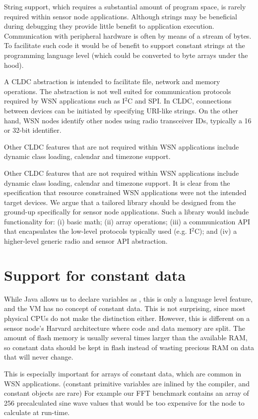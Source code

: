 String support, which requires a substantial amount of program space, is rarely required within sensor node applications. Although strings may be beneficial during debugging they provide little benefit to application execution. Communication with peripheral hardware is often by means of a stream of bytes. To facilitate such code it would be of benefit to support constant strings at the programming language level (which could be converted to byte arrays under the hood).

A CLDC  abstraction is intended to facilitate file, network and memory operations. The abstraction is not well suited for communication protocols required by WSN applications such as I$^{2}$C and SPI. In CLDC, connections between devices can be initiated by specifying URI-like strings. On the other hand, WSN nodes identify other nodes using radio transceiver IDs, typically a 16 or 32-bit identifier.

Other CLDC features that are not required within WSN applications include dynamic class loading, calendar and timezone support.

Other CLDC features that are not required within WSN applications include dynamic class loading, calendar and timezone support. It is clear from the specification that resource constrained WSN applications were not the intended target devices. We argue that a tailored library should be designed from the ground-up specifically for sensor node applications. Such a library would include functionality for: (i) basic math; (ii) array operations; (iii) a communication API that encapsulates the low-level protocols typically used (e.g. I$^{2}$C); and (iv) a higher-level generic radio and sensor API abstraction.

\section{Support for constant data}
\label{sec-const-data}
While Java allows us to declare variables as , this is only a language level feature, and the VM has no concept of constant data. This is not surprising, since most physical CPUs do not make the distinction either. However, this is different on a sensor node's Harvard architecture where code and data memory are split. The amount of flash memory is usually several times larger than the available RAM, so constant data should be kept in flash instead of wasting precious RAM on data that will never change.

This is especially important for arrays of constant data, which are common in WSN applications. (constant primitive variables are inlined by the compiler, and constant objects are rare) For example our FFT benchmark contains an array of 256 precalculated sine wave values that would be too expensive for the node to calculate at run-time.

